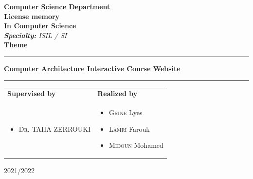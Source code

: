 \begin{titlepage}
\begin{center}
{ \textbf{Computer Science Department}}\\ \vspace{0.8cm}
\Huge{\textbf{License memory}} \\ \Large{\textbf{In Computer Science}} \\\vspace{0.3cm}
\large{\emph{\textbf{Specialty: } ISIL / SI}}\\ \vspace{0.8cm}
\huge{\textbf{Theme}}\\ %
\noindent\rule{\textwidth}{1mm}
\Large{\textbf{Computer Architecture Interactive Course Website}}
\noindent\rule{\textwidth}{1mm}
\end{center}
\vspace{0.3cm}
\begin{tabular}{ p{9cm}  p{6cm} }
\textbf{Supervised by} & \textbf{Realized by} \\
\begin{itemize}
	\item \textsc{Dr.} TAHA ZERROUKI
\end{itemize}
&
\begin{itemize}
	\item \textsc{Grine} Lyes
  \item \textsc{Lamri} Farouk
	\item \textsc{Midoun} Mohamed
\end{itemize}
\\
\end{tabular}
\vspace{3.0cm}
\begin{center}
2021/2022
\end{center}

\end{titlepage}